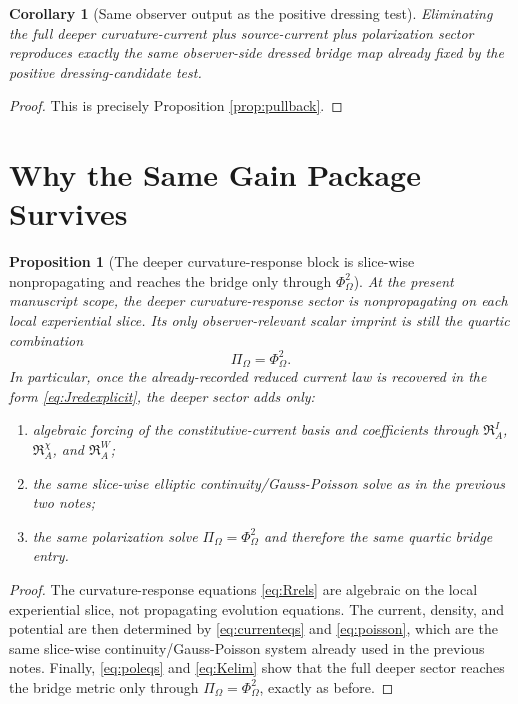 \documentclass[11pt]{article}
\newcommand{\FlowPot}{\Phi_\Omega}
\newcommand{\BalanceField}{\Pi_\Omega}
\newtheorem{proposition}{Proposition}
\newtheorem{corollary}{Corollary}
\begin{document}
\begin{corollary}[Same observer output as the positive dressing test]
\label{cor:sameoutput}
Eliminating the full deeper curvature-current plus source-current plus polarization sector reproduces exactly the same observer-side dressed bridge map already fixed by the positive dressing-candidate test.
\end{corollary}

\begin{proof}
This is precisely Proposition \ref{prop:pullback}.
\end{proof}

\section{Why the Same Gain Package Survives}

\begin{proposition}[The deeper curvature-response block is slice-wise nonpropagating and reaches the bridge only through \texorpdfstring{\(\FlowPot^2\)}{Phi^2}]
\label{prop:elliptic}
At the present manuscript scope, the deeper curvature-response sector is nonpropagating on each local experiential slice. Its only observer-relevant scalar imprint is still the quartic combination
\begin{equation}
\BalanceField=\FlowPot^2.
\label{eq:quarticentry}
\end{equation}
In particular, once the already-recorded reduced current law is recovered in the form \eqref{eq:Jredexplicit}, the deeper sector adds only:
\begin{enumerate}
    \item algebraic forcing of the constitutive-current basis and coefficients through \(\mathfrak R_A^I\), \(\mathfrak R_A^\chi\), and \(\mathfrak R_A^W\);
    \item the same slice-wise elliptic continuity/Gauss-Poisson solve as in the previous two notes;
    \item the same polarization solve \(\BalanceField=\FlowPot^2\) and therefore the same quartic bridge entry.
\end{enumerate}
\end{proposition}

\begin{proof}
The curvature-response equations \eqref{eq:Rrels} are algebraic on the local experiential slice, not propagating evolution equations. The current, density, and potential are then determined by \eqref{eq:currenteqs} and \eqref{eq:poisson}, which are the same slice-wise continuity/Gauss-Poisson system already used in the previous notes. Finally, \eqref{eq:poleqs} and \eqref{eq:Kelim} show that the full deeper sector reaches the bridge metric only through \(\BalanceField=\FlowPot^2\), exactly as before.
\end{proof}
\end{document}
